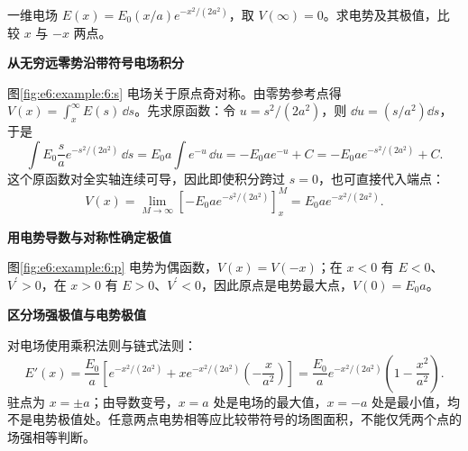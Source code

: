 \begin{question}\begin{example}[奇对称电场图像的电势比较]\label{e6:example:6}
一维电场 $E(x)=E_0(x/a)e^{-x^2/(2a^2)}$，取 $V(\infty)=0$。求电势及其极值，比较 $x$ 与 $-x$ 两点。
\end{example}
\end{question}
\begin{solution}\textbf{从无穷远零势沿带符号电场积分}\par\nobreak
图\ref{fig:e6:example:6:s} 电场关于原点奇对称。由零势参考点得 $V(x)=\int_x^\infty E(s)\,\dd s$。先求原函数：令 $u=s^2/(2a^2)$，则 $\dd u=(s/a^2)\dd s$，于是
\[
\int E_0\frac{s}{a}e^{-s^2/(2a^2)}\,\dd s
=E_0a\int e^{-u}\,\dd u
=-E_0a e^{-u}+C=-E_0a e^{-s^2/(2a^2)}+C.
\]
这个原函数对全实轴连续可导，因此即使积分跨过 $s=0$，也可直接代入端点：
\[
V(x)=\lim_{M\to\infty}
[-E_0a e^{-s^2/(2a^2)}]_x^M
=E_0a e^{-x^2/(2a^2)}.
\]



\par\medskip{}\noindent\textbf{用电势导数与对称性确定极值}\par\nobreak
图\ref{fig:e6:example:6:p} 电势为偶函数，$V(x)=V(-x)$；在 $x<0$ 有 $E<0$、$V^\prime>0$，在 $x>0$ 有 $E>0$、$V^\prime<0$，因此原点是电势最大点，$V(0)=E_0a$。

\par\medskip{}\noindent\textbf{区分场强极值与电势极值}\par\nobreak
对电场使用乘积法则与链式法则：
\[
E'(x)=\frac{E_0}{a}\left[
e^{-x^2/(2a^2)}+x e^{-x^2/(2a^2)}
\left(-\frac{x}{a^2}\right)\right]
=\frac{E_0}{a}e^{-x^2/(2a^2)}
\left(1-\frac{x^2}{a^2}\right).
\]
驻点为 $x=\pm a$；由导数变号，$x=a$ 处是电场的最大值，$x=-a$ 处是最小值，均不是电势极值处。任意两点电势相等应比较带符号的场图面积，不能仅凭两个点的场强相等判断。\end{solution}
